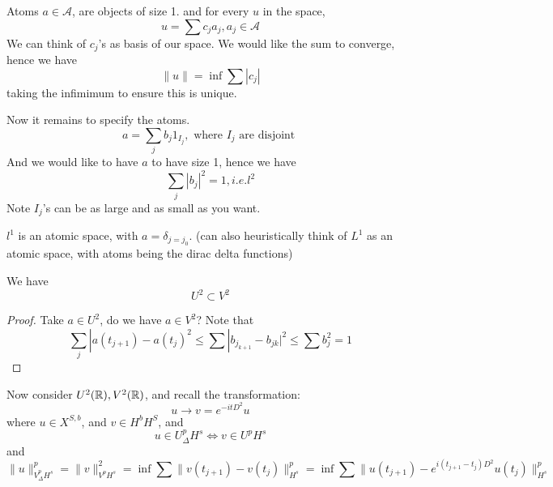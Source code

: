 Atoms $a\in\mathcal{A}$, are objects of size 1. and for every $u$ in the space,
\begin{equation*}
    u=\sum c_ja_j, a_j\in\mathcal{A}
\end{equation*}
We can think of $c_j$'s as basis of our space. We would like the sum to converge, hence we have
\begin{equation*}
    \|u\|=\inf\sum|c_j|
\end{equation*}
taking the infimimum to ensure this is unique.

Now it remains to specify the atoms.
\begin{equation*}
    a=\sum_j b_j1_{I_j}, \text{ where } I_j \text{ are disjoint }
\end{equation*}
And we would like to have $a$ to have size 1, hence we have
\begin{equation*}
    \sum_j|b_j|^2=1, i.e. l^2
\end{equation*}
Note $I_j$'s can be as large and as small as you want.

\begin{example}
    $l^1$ is an atomic space, with $a=\delta_{j=j_0}$. (can also heuristically think of $L^1$ as an atomic space, with atoms being the dirac delta functions)
\end{example}
\begin{lemma}
    We have
    \begin{equation*}
        U^2\subset V^2
    \end{equation*}
\end{lemma}
\begin{proof}
    Take $a\in U^2$, do we have $a\in V^2$? Note that 
    \begin{equation*}
        \sum_j|a(t_{j+1})-a(t_j)^2\leq\sum|b_{j_{k+1}}-b_{jk}|^2\leq\sum b_j^2=1
    \end{equation*}
\end{proof}

Now consider $U^2(\mathbb{R}), V^2(\mathbb{R})$, and recall the transformation:
\begin{equation*}
    u\to v=e^{-itD^2}u
\end{equation*}
where $u\in X^{S,b}$, and $v\in H^bH^S$, and 
\begin{equation*}
    u\in U_\Delta ^pH^s\iff v\in U^pH^s
\end{equation*}
and 
\begin{equation*}
    \|u\|_{V_\Delta^pH^s}^p=\|v\|_{V^pH^s}^2=\inf \sum\|v(t_{j+1})-v(t_j)\|_{H^s}^p=\inf\sum\|u(t_{j+1})-e^{i(t_{j+1}-t_j)D^2}u(t_j)\|_{H^s}^p
\end{equation*}

